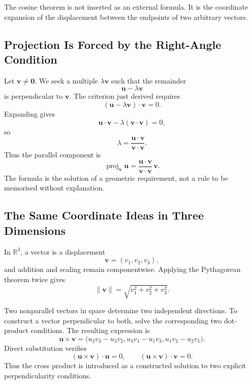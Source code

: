 The cosine theorem is not inserted as an external formula. It is the coordinate
expansion of the displacement between the endpoints of two arbitrary vectors.

\begin{center}
\end{center}

\subsection{Projection Is Forced by the Right-Angle Condition}

Let $\mathbf v\neq\mathbf0$. We seek a multiple $\lambda\mathbf v$ such that
the remainder
\[
\mathbf u-\lambda\mathbf v
\]
is perpendicular to $\mathbf v$. The criterion just derived requires
\[
(\mathbf u-\lambda\mathbf v)\cdot\mathbf v=0.
\]
Expanding gives
\[
\mathbf u\cdot\mathbf v-
\lambda(\mathbf v\cdot\mathbf v)=0,
\]
so
\[
\lambda
=
\frac{\mathbf u\cdot\mathbf v}{\mathbf v\cdot\mathbf v}.
\]
Thus the parallel component is
\[
\operatorname{proj}_{\mathbf v}\mathbf u
=
\frac{\mathbf u\cdot\mathbf v}{\mathbf v\cdot\mathbf v}\,\mathbf v.
\]
The formula is the solution of a geometric requirement, not a rule to be
memorised without explanation.

\subsection{The Same Coordinate Ideas in Three Dimensions}

In $\mathbb R^3$, a vector is a displacement
\[
\mathbf v=(v_1,v_2,v_3),
\]
and addition and scaling remain componentwise. Applying the Pythagorean theorem
twice gives
\[
\|\mathbf v\|
=
\sqrt{v_1^2+v_2^2+v_3^2}.
\]

Two nonparallel vectors in space determine two independent directions. To
construct a vector perpendicular to both, solve the corresponding two dot-product
conditions. The resulting expression is
\[
\mathbf u\times\mathbf v
=
\bigl(
 u_2v_3-u_3v_2,
 u_3v_1-u_1v_3,
 u_1v_2-u_2v_1
\bigr).
\]
Direct substitution verifies
\[
(\mathbf u\times\mathbf v)\cdot\mathbf u=0,
\qquad
(\mathbf u\times\mathbf v)\cdot\mathbf v=0.
\]
Thus the cross product is introduced as a constructed solution to two explicit
perpendicularity conditions.

